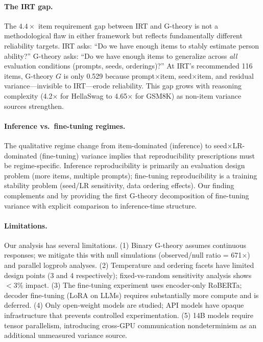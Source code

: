 \documentclass[letterpaper]{article}
\newcommand{\gcoeff}{\ensuremath{G}}
\newcommand{\pct}{\%}
\begin{document}
\paragraph{The IRT gap.}
The $4.4\times$ item requirement gap between IRT and G-theory is not a methodological flaw in either framework but reflects fundamentally different reliability targets.
IRT asks: ``Do we have enough items to stably estimate person ability?''
G-theory asks: ``Do we have enough items to generalize across \textit{all} evaluation conditions (prompts, seeds, orderings)?''
At IRT's recommended 116 items, G-theory $\gcoeff{}$ is only 0.529 because prompt$\times$item, seed$\times$item, and residual variance---invisible to IRT---erode reliability.
This gap grows with reasoning complexity (4.2$\times$ for HellaSwag to 4.65$\times$ for GSM8K) as non-item variance sources strengthen.

\paragraph{Inference vs.\ fine-tuning regimes.}
The qualitative regime change from item-dominated (inference) to seed$\times$LR-dominated (fine-tuning) variance implies that reproducibility prescriptions must be regime-specific.
Inference reproducibility is primarily an evaluation design problem (more items, multiple prompts); fine-tuning reproducibility is a training stability problem (seed/LR sensitivity, data ordering effects).
Our finding complements \citet{dodge2020} and \citet{sellam2022} by providing the first G-theory decomposition of fine-tuning variance with explicit comparison to inference-time structure.

\paragraph{Limitations.}
Our analysis has several limitations.
(1) Binary G-theory assumes continuous responses; we mitigate this with null simulations (observed/null ratio = 671$\times$) and parallel logprob analyses.
(2) Temperature and ordering facets have limited design points (3 and 4 respectively); fixed-vs-random sensitivity analysis shows $<$3\pct{} impact.
(3) The fine-tuning experiment uses encoder-only RoBERTa; decoder fine-tuning (LoRA on LLMs) requires substantially more compute and is deferred.
(4) Only open-weight models are studied; API models have opaque infrastructure that prevents controlled experimentation.
(5) 14B models require tensor parallelism, introducing cross-GPU communication nondeterminism as an additional unmeasured variance source.
\end{document}
